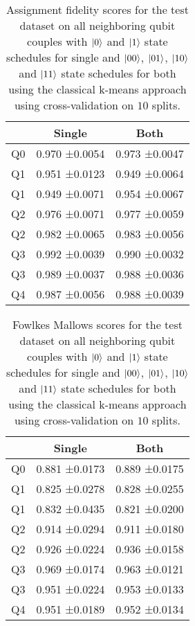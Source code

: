 \documentclass[conference]{IEEEtran}
\begin{document}
\begin{table}[]
\begin{tabular}{lll}
   & \multicolumn{1}{c}{Single} & \multicolumn{1}{c}{Both} \\ \hline
Q0 &    0.970 ±0.0054           &       0.973 ±0.0047      \\
Q1 &    0.951 ±0.0123           &       0.949 ±0.0064      \\ \hline
Q1 &    0.949 ±0.0071           &       0.954 ±0.0067      \\
Q2 &    0.976 ±0.0071           &       0.977 ±0.0059      \\ \hline
Q2 &    0.982 ±0.0065           &       0.983 ±0.0056      \\
Q3 &    0.992 ±0.0039           &       0.990 ±0.0032      \\ \hline
Q3 &    0.989 ±0.0037           &       0.988 ±0.0036      \\
Q4 &    0.987 ±0.0056           &       0.988 ±0.0039
\end{tabular}
\caption{Assignment fidelity scores for the test dataset on all neighboring qubit couples with \(\ket{0}\) and \(\ket{1}\) state schedules for single and \(\ket{00}\), \(\ket{01}\), \(\ket{10}\) and \(\ket{11}\) state schedules for both using the classical k-means approach using cross-validation on \(10\) splits.}
\label{table:classical_assignment}
\end{table}

\begin{table}[]
\begin{tabular}{lll}
   & \multicolumn{1}{c}{Single} & \multicolumn{1}{c}{Both} \\ \hline
Q0 &    0.881 ±0.0173           &       0.889 ±0.0175      \\
Q1 &    0.825 ±0.0278           &       0.828 ±0.0255      \\ \hline
Q1 &    0.832 ±0.0435           &       0.821 ±0.0200      \\
Q2 &    0.914 ±0.0294           &       0.911 ±0.0180      \\ \hline
Q2 &    0.926 ±0.0224           &       0.936 ±0.0158      \\
Q3 &    0.969 ±0.0174           &       0.963 ±0.0121      \\ \hline
Q3 &    0.951 ±0.0224           &       0.953 ±0.0133      \\
Q4 &    0.951 ±0.0189           &       0.952 ±0.0134
\end{tabular}
\caption{Fowlkes Mallows scores for the test dataset on all neighboring qubit couples with \(\ket{0}\) and \(\ket{1}\) state schedules for single and \(\ket{00}\), \(\ket{01}\), \(\ket{10}\) and \(\ket{11}\) state schedules for both using the classical k-means approach using cross-validation on \(10\) splits.}
\label{table:classical_fowlkes}
\end{table}
\end{document}

